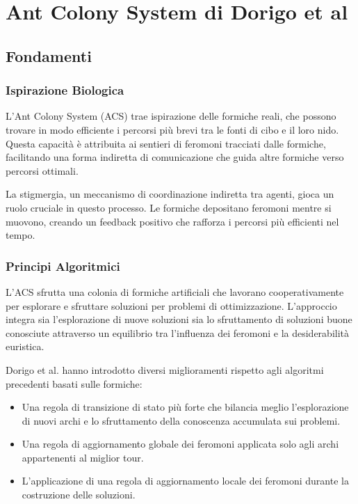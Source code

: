 
%

\chapter{Ant Colony System di Dorigo et al}\label{chapt:5}



\section{Fondamenti}

\subsection{Ispirazione Biologica}
L'Ant Colony System (\gls{ACS}) trae ispirazione delle formiche reali, che possono trovare in modo efficiente i percorsi più brevi tra le fonti di cibo e il loro nido. Questa capacità è attribuita ai sentieri di feromoni tracciati dalle formiche, facilitando una forma indiretta di comunicazione che guida altre formiche verso percorsi ottimali\cite{Dorigo1996, Dorigo1997}.

La stigmergia, un meccanismo di coordinazione indiretta tra agenti, gioca un ruolo cruciale in questo processo\cite{Bonabeau1999}. Le formiche depositano feromoni mentre si muovono, creando un feedback positivo che rafforza i percorsi più efficienti nel tempo\cite{Deneubourg1990}.

\subsection{Principi Algoritmici}
L'\gls{ACS} sfrutta una colonia di formiche artificiali che lavorano cooperativamente per esplorare e sfruttare soluzioni per problemi di ottimizzazione. L'approccio integra sia l'esplorazione di nuove soluzioni sia lo sfruttamento di soluzioni buone conosciute attraverso un equilibrio tra l'influenza dei feromoni e la desiderabilità euristica.\cite{Dorigo1996, Dorigo1997}

Dorigo et al. hanno introdotto diversi miglioramenti rispetto agli algoritmi precedenti basati sulle formiche:

\begin{itemize}
	\item Una regola di transizione di stato più forte che bilancia meglio l'esplorazione di nuovi archi e lo sfruttamento della conoscenza accumulata sui problemi.
	\item Una regola di aggiornamento globale dei feromoni applicata solo agli archi appartenenti al miglior tour.
	\item L'applicazione di una regola di aggiornamento locale dei feromoni durante la costruzione delle soluzioni.
\end{itemize}

